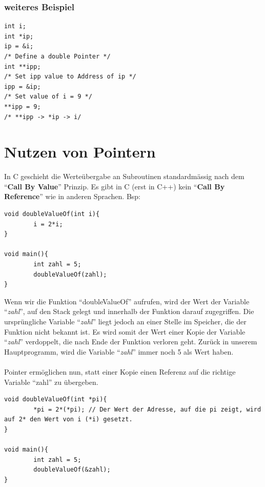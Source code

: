 \documentclass[a4paper,10pt]{report}
\begin{document}
\subsubsection{weiteres Beispiel}

\begin{lstlisting}[frame=single] 
int i;
int *ip;
ip = &i;
/* Define a double Pointer */
int **ipp;
/* Set ipp value to Address of ip */
ipp = &ip;
/* Set value of i = 9 */
**ipp = 9;
/* **ipp -> *ip -> i/
\end{lstlisting}
\newpage

\section{Nutzen von Pointern}
In C geschieht die Werteübergabe an Subroutinen standardmässig nach dem "`\textbf{Call By Value}"' Prinzip. Es gibt in C (erst in C++) kein "`\textbf{Call By Reference}"' wie in anderen Sprachen. Bsp: \\
\begin{lstlisting}[]
void doubleValueOf(int i){
		i = 2*i;
}

void main(){
		int zahl = 5;
		doubleValueOf(zahl);
}
\end{lstlisting}
Wenn wir die Funktion "`doubleValueOf"' aufrufen, wird der Wert der Variable "`\textit{zahl}"', auf den Stack gelegt und innerhalb der Funktion darauf zugegriffen. Die ursprüngliche Variable "`\textit{zahl}"' liegt jedoch an einer Stelle im Speicher, die der Funktion nicht bekannt ist. Es wird somit der Wert einer Kopie der Variable "`\textit{zahl}"' verdoppelt, die nach Ende der Funktion verloren geht. Zurück in unserem Hauptprogramm, wird die Variable "`\textit{zahl}"' immer noch 5 als Wert haben. \\\\
Pointer ermöglichen nun, statt einer Kopie einen Referenz auf die richtige Variable "`zahl"' zu übergeben.\\
\begin{lstlisting}[]
void doubleValueOf(int *pi){
		*pi = 2*(*pi); // Der Wert der Adresse, auf die pi zeigt, wird auf 2* den Wert von i (*i) gesetzt.
}

void main(){
		int zahl = 5;
		doubleValueOf(&zahl);
}
\end{lstlisting}
\end{document}
